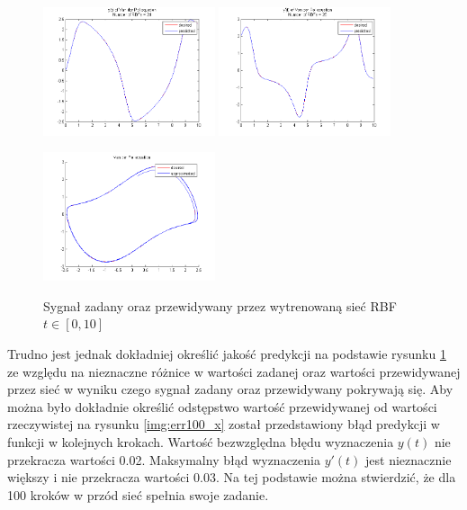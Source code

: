 \begin{figure}[ht!]
	\centering

	\subfloat
	{\includegraphics[width=0.45\textwidth]
	{images/signal_pred100.png}}
	\subfloat
	{\includegraphics[width=0.45\textwidth]
	{images/deriv_pred100.png}}	
	
	\subfloat
	{\includegraphics[width=0.45\textwidth]
	{images/trajectory_pred100.png}}

	\caption{Sygnał zadany oraz przewidywany przez wytrenowaną sieć RBF $t \in [0,10]$}
	\label{img:predicted}
\end{figure}

Trudno jest jednak dokładniej określić jakość predykcji na podstawie rysunku \ref{img:predicted} ze względu na nieznaczne różnice w wartości zadanej oraz wartości przewidywanej przez sieć w wyniku czego sygnał zadany oraz przewidywany pokrywają się. Aby można było dokładnie określić odstępstwo wartość przewidywanej od wartości rzeczywistej na rysunku \ref{img:err100_x} został przedstawiony błąd predykcji w funkcji w kolejnych krokach. Wartość bezwzględna błędu wyznaczenia $y(t)$ nie przekracza wartości 0.02. Maksymalny błąd wyznaczenia $y'(t)$ jest nieznacznie większy i nie przekracza wartości 0.03. Na tej podstawie można stwierdzić, że dla 100 kroków w przód sieć spełnia swoje zadanie. 

